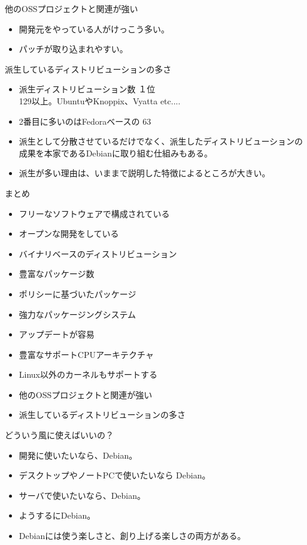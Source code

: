 \begin{frame}{他のOSSプロジェクトと関連が強い}
\begin{itemize}
\item 開発元をやっている人がけっこう多い。
\item パッチが取り込まれやすい。
\end{itemize}
\end{frame}


\begin{frame}{派生しているディストリビューションの多さ}

\begin{itemize}
\item 派生ディストリビューション数 １位\\
129以上。UbuntuやKnoppix、Vyatta etc....
\item 2番目に多いのはFedoraベースの 63
\item 派生として分散させているだけでなく、派生したディストリビューションの
成果を本家であるDebianに取り組む仕組みもある。
\item 派生が多い理由は、いままで説明した特徴によるところが大きい。
\end{itemize}
\end{frame}

\begin{frame}{まとめ}
\begin{itemize}
\item フリーなソフトウェアで構成されている
\item オープンな開発をしている
\item バイナリベースのディストリビューション
\item 豊富なパッケージ数
\item ポリシーに基づいたパッケージ
\item 強力なパッケージングシステム
\item アップデートが容易
\item 豊富なサポートCPUアーキテクチャ
\item Linux以外のカーネルもサポートする
\item 他のOSSプロジェクトと関連が強い
\item 派生しているディストリビューションの多さ
\end{itemize}
\end{frame}


\begin{frame}{どういう風に使えばいいの？}
\begin{itemize}[<+->]
\item 開発に使いたいなら、Debian。\\
\item デスクトップやノートPCで使いたいなら Debian。
\item サーバで使いたいなら、Debian。\\
\item ようするにDebian。
\item Debianには使う楽しさと、創り上げる楽しさの両方がある。
\end{itemize}


\end{frame}


